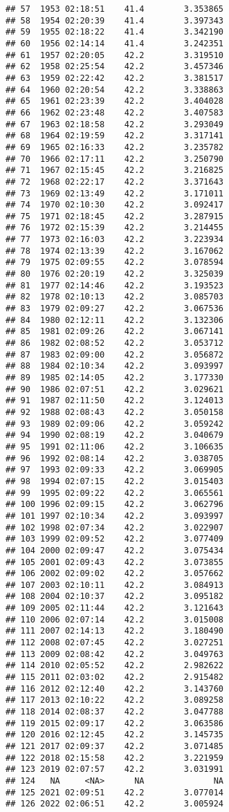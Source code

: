 \documentclass[
]{article}
\begin{document}
\begin{verbatim}
## 57  1953 02:18:51    41.4        3.353865
## 58  1954 02:20:39    41.4        3.397343
## 59  1955 02:18:22    41.4        3.342190
## 60  1956 02:14:14    41.4        3.242351
## 61  1957 02:20:05    42.2        3.319510
## 62  1958 02:25:54    42.2        3.457346
## 63  1959 02:22:42    42.2        3.381517
## 64  1960 02:20:54    42.2        3.338863
## 65  1961 02:23:39    42.2        3.404028
## 66  1962 02:23:48    42.2        3.407583
## 67  1963 02:18:58    42.2        3.293049
## 68  1964 02:19:59    42.2        3.317141
## 69  1965 02:16:33    42.2        3.235782
## 70  1966 02:17:11    42.2        3.250790
## 71  1967 02:15:45    42.2        3.216825
## 72  1968 02:22:17    42.2        3.371643
## 73  1969 02:13:49    42.2        3.171011
## 74  1970 02:10:30    42.2        3.092417
## 75  1971 02:18:45    42.2        3.287915
## 76  1972 02:15:39    42.2        3.214455
## 77  1973 02:16:03    42.2        3.223934
## 78  1974 02:13:39    42.2        3.167062
## 79  1975 02:09:55    42.2        3.078594
## 80  1976 02:20:19    42.2        3.325039
## 81  1977 02:14:46    42.2        3.193523
## 82  1978 02:10:13    42.2        3.085703
## 83  1979 02:09:27    42.2        3.067536
## 84  1980 02:12:11    42.2        3.132306
## 85  1981 02:09:26    42.2        3.067141
## 86  1982 02:08:52    42.2        3.053712
## 87  1983 02:09:00    42.2        3.056872
## 88  1984 02:10:34    42.2        3.093997
## 89  1985 02:14:05    42.2        3.177330
## 90  1986 02:07:51    42.2        3.029621
## 91  1987 02:11:50    42.2        3.124013
## 92  1988 02:08:43    42.2        3.050158
## 93  1989 02:09:06    42.2        3.059242
## 94  1990 02:08:19    42.2        3.040679
## 95  1991 02:11:06    42.2        3.106635
## 96  1992 02:08:14    42.2        3.038705
## 97  1993 02:09:33    42.2        3.069905
## 98  1994 02:07:15    42.2        3.015403
## 99  1995 02:09:22    42.2        3.065561
## 100 1996 02:09:15    42.2        3.062796
## 101 1997 02:10:34    42.2        3.093997
## 102 1998 02:07:34    42.2        3.022907
## 103 1999 02:09:52    42.2        3.077409
## 104 2000 02:09:47    42.2        3.075434
## 105 2001 02:09:43    42.2        3.073855
## 106 2002 02:09:02    42.2        3.057662
## 107 2003 02:10:11    42.2        3.084913
## 108 2004 02:10:37    42.2        3.095182
## 109 2005 02:11:44    42.2        3.121643
## 110 2006 02:07:14    42.2        3.015008
## 111 2007 02:14:13    42.2        3.180490
## 112 2008 02:07:45    42.2        3.027251
## 113 2009 02:08:42    42.2        3.049763
## 114 2010 02:05:52    42.2        2.982622
## 115 2011 02:03:02    42.2        2.915482
## 116 2012 02:12:40    42.2        3.143760
## 117 2013 02:10:22    42.2        3.089258
## 118 2014 02:08:37    42.2        3.047788
## 119 2015 02:09:17    42.2        3.063586
## 120 2016 02:12:45    42.2        3.145735
## 121 2017 02:09:37    42.2        3.071485
## 122 2018 02:15:58    42.2        3.221959
## 123 2019 02:07:57    42.2        3.031991
## 124   NA     <NA>      NA              NA
## 125 2021 02:09:51    42.2        3.077014
## 126 2022 02:06:51    42.2        3.005924
\end{verbatim}
\end{document}
